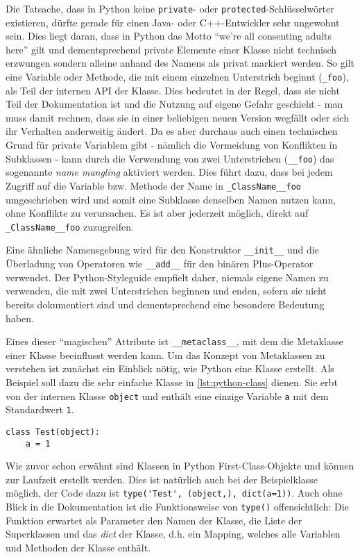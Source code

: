 Die Tatsache, dass in Python keine \lstinline{private}- oder \lstinline{protected}-Schlüsselwörter
existieren, dürfte gerade für einen Java- oder C++-Entwickler sehr ungewohnt sein. Dies liegt
daran, dass in Python das Motto \enquote{we're all consenting adults here} \citep{pymail:adults}
gilt und dementsprechend private Elemente einer Klasse nicht technisch erzwungen sondern alleine
anhand des Namens als privat markiert werden. So gilt eine Variable oder Methode, die mit einem
einzelnen Unterstrich beginnt (\lstinline{_foo}), als Teil der internen API der Klasse. Dies
bedeutet in der Regel, dass sie nicht Teil der Dokumentation ist und die Nutzung auf eigene Gefahr
geschieht - man muss damit rechnen, dass sie in einer beliebigen neuen Version wegfällt oder sich
ihr Verhalten anderweitig ändert. Da es aber durchaus auch einen technischen Grund für private
Variablem gibt - nämlich die Vermeidung von Konflikten in Subklassen - kann durch die Verwendung von
zwei Unterstrichen (\lstinline{__foo}) das sogenannte \emph{name mangling} aktiviert werden. Dies
führt dazu, dass bei jedem Zugriff auf die Variable bzw. Methode der Name in
\lstinline{_ClassName__foo} umgeschrieben wird und somit eine Subklasse denselben Namen nutzen kann,
ohne Konflikte zu verursachen. Es ist aber jederzeit möglich, direkt auf \lstinline{_ClassName__foo}
zuzugreifen.

Eine ähnliche Namensgebung wird für den Konstruktor \lstinline{__init__} und die Überladung von
Operatoren wie \lstinline{__add__} für den binären Plus-Operator verwendet. Der
Python-Styleguide empfielt daher, niemals eigene Namen zu verwenden, die mit zwei Unterstrichen
beginnen und enden, sofern sie nicht bereits dokumentiert sind und dementsprechend eine besondere
Bedeutung haben.

Eines dieser \enquote{magischen} Attribute ist \lstinline{__metaclass__}, mit dem die Metaklasse
einer Klasse beeinflusst werden kann. Um das Konzept von Metaklassen zu verstehen ist zunächst ein
Einblick nötig, wie Python eine Klasse erstellt. Als Beispiel soll dazu die sehr einfache Klasse in
\autoref{lst:python-class} dienen. Sie erbt von der internen Klasse \lstinline{object} und enthält
eine einzige Variable \lstinline{a} mit dem Standardwert \lstinline{1}.

\begin{lstlisting}[caption=Python-Klassendefinition,label=lst:python-class]
class Test(object):
    a = 1
\end{lstlisting}

Wie zuvor schon erwähnt sind Klassen in Python First-Class-Objekte und können zur Laufzeit erstellt
werden. Dies ist natürlich auch bei der Beispielklasse möglich, der Code dazu ist
\lstinline{type('Test', (object,), dict(a=1))}.
Auch ohne Blick in die Dokumentation ist die Funktionsweise von \lstinline{type()} offensichtlich:
Die Funktion erwartet als Parameter den Namen der Klasse, die Liste der Superklassen und das
\emph{dict} der Klasse, d.h. ein Mapping, welches alle Variablen und Methoden der Klasse enthält.

